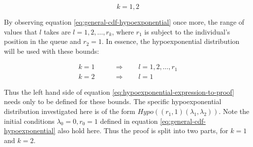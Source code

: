\begin{equation*}
    k = 1, 2
\end{equation*}

By observing equation \ref{eq:general-cdf-hypoexponential} once more, the range
of values that \(l\) takes are \(l = 1, 2, \dots, r_k\), where \(r_1\) is 
subject to the individual's position in the queue and \(r_2 = 1\).
In essence, the hypoexponential distribution will be used with these bounds:

\begin{align}
    k = 1 & \qquad \Rightarrow \qquad l = 1, 2, \dots, r_1 \nonumber \\
    k = 2 & \qquad \Rightarrow \qquad l = 1
\end{align}

Thus the left hand side of equation \ref{eq:hypoexponential-expression-to-proof} 
needs only to be defined for these bounds. 
The specific hypoexponential distribution investigated here is of the form
\(Hypo((r_1, 1)(\lambda_1, \lambda_2))\).
Note the initial conditions \(\lambda_0=0, r_0=1\) defined in equation 
\ref{eq:general-cdf-hypoexponential} also hold here.
Thus the proof is split into two parts, for \(k=1\) and \(k=2\).



